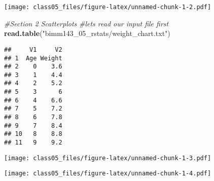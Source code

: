 \documentclass[]{article}
\newenvironment{Shaded}{\begin{snugshade}}{\end{snugshade}}
\newcommand{\CommentTok}[1]{\textcolor[rgb]{0.56,0.35,0.01}{\textit{#1}}}
\newcommand{\DataTypeTok}[1]{\textcolor[rgb]{0.13,0.29,0.53}{#1}}
\newcommand{\DecValTok}[1]{\textcolor[rgb]{0.00,0.00,0.81}{#1}}
\newcommand{\KeywordTok}[1]{\textcolor[rgb]{0.13,0.29,0.53}{\textbf{#1}}}
\newcommand{\NormalTok}[1]{#1}
\newcommand{\OperatorTok}[1]{\textcolor[rgb]{0.81,0.36,0.00}{\textbf{#1}}}
\newcommand{\OtherTok}[1]{\textcolor[rgb]{0.56,0.35,0.01}{#1}}
\newcommand{\StringTok}[1]{\textcolor[rgb]{0.31,0.60,0.02}{#1}}
\begin{document}
\texttt{[image: class05\_files/figure-latex/unnamed-chunk-1-2.pdf]}

\begin{Shaded}
\begin{Highlighting}[]
\CommentTok{#Section 2 Scatterplots}
\CommentTok{#lets read our input file first}
\KeywordTok{read.table}\NormalTok{(}\StringTok{"bimm143_05_rstats/weight_chart.txt"}\NormalTok{)}
\end{Highlighting}
\end{Shaded}

\begin{verbatim}
##     V1     V2
## 1  Age Weight
## 2    0    3.6
## 3    1    4.4
## 4    2    5.2
## 5    3      6
## 6    4    6.6
## 7    5    7.2
## 8    6    7.8
## 9    7    8.4
## 10   8    8.8
## 11   9    9.2
\end{verbatim}

\begin{Shaded}
\end{Shaded}

\texttt{[image: class05\_files/figure-latex/unnamed-chunk-1-3.pdf]}

\begin{Shaded}
\end{Shaded}

\texttt{[image: class05\_files/figure-latex/unnamed-chunk-1-4.pdf]}

\begin{Shaded}
\end{Shaded}
\end{document}
